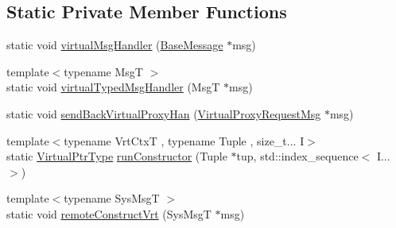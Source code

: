 \subsection*{Static Private Member Functions}
\begin{DoxyCompactItemize}
\item 
static void \hyperlink{structvt_1_1vrt_1_1_virtual_context_manager_abb1cc10ecf9f53a7f9486cf69446ee81}{virtual\+Msg\+Handler} (\hyperlink{namespacevt_ac34f95a5e2b8109b55bfba52b074443d}{Base\+Message} $\ast$msg)
\item 
{\footnotesize template$<$typename MsgT $>$ }\\static void \hyperlink{structvt_1_1vrt_1_1_virtual_context_manager_a62719655b49a47446040710712da6419}{virtual\+Typed\+Msg\+Handler} (MsgT $\ast$msg)
\item 
static void \hyperlink{structvt_1_1vrt_1_1_virtual_context_manager_aafefc0c35c19338d87f145999c13e011}{send\+Back\+Virtual\+Proxy\+Han} (\hyperlink{structvt_1_1vrt_1_1_virtual_proxy_request_msg}{Virtual\+Proxy\+Request\+Msg} $\ast$msg)
\item 
{\footnotesize template$<$typename Vrt\+CtxT , typename Tuple , size\+\_\+t... I$>$ }\\static \hyperlink{structvt_1_1vrt_1_1_virtual_context_manager_a24dd2acbbd37a53f4e4108d385a58441}{Virtual\+Ptr\+Type} \hyperlink{structvt_1_1vrt_1_1_virtual_context_manager_a02bc09728afef757b4dddf5813da92be}{run\+Constructor} (Tuple $\ast$tup, std\+::index\+\_\+sequence$<$ I... $>$)
\item 
{\footnotesize template$<$typename Sys\+MsgT $>$ }\\static void \hyperlink{structvt_1_1vrt_1_1_virtual_context_manager_af0aa4bd21034e4ab55875760600829a5}{remote\+Construct\+Vrt} (Sys\+MsgT $\ast$msg)
\end{DoxyCompactItemize}

